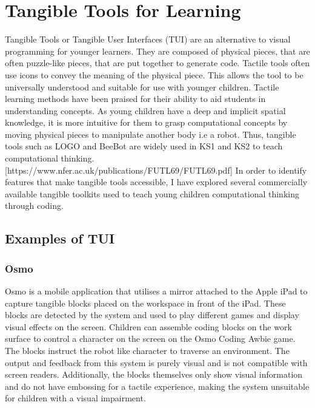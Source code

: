 \documentclass[oneside,%
                    author={Malak Hajji},
                    degree={BSc},
                    title={Designing An Accessible Computational Toolkit For Students},
                  subtitle={With Mixed Visual Abilities}]{dissertation}
\begin{document}
\section{Tangible Tools for Learning}

Tangible Tools or Tangible User Interfaces (TUI) are an alternative to visual programming for younger learners. They are composed of physical pieces, that are often puzzle-like pieces, that are put together to generate code. Tactile tools often use icons to convey the meaning of the physical piece. This allows the tool to be universally understood and suitable for use with younger children. Tactile learning methods have been praised for their ability to aid students in understanding concepts. As young children have a deep and implicit spatial knowledge, it is more intuitive for them to grasp computational concepts by moving physical pieces to manipulate another body i.e a robot. Thus, tangible tools such as LOGO and BeeBot are widely used in KS1 and KS2 to teach computational thinking. [https://www.nfer.ac.uk/publications/FUTL69/FUTL69.pdf]
In order to identify features that make tangible tools accessible, I have explored several commercially available tangible toolkits used to teach young children computational thinking through coding.

\subsection{Examples of TUI}
\subsubsection{Osmo}
Osmo is a mobile application that utilises a mirror attached to the Apple iPad to capture tangible blocks placed on the workspace in front of the iPad. These blocks are detected by the system and used to play different games and display visual effects on the screen. Children can assemble coding blocks on the work surface to control a character on the screen on the Osmo Coding Awbie game. The blocks instruct the robot like character to traverse an environment. The output and feedback from this system is purely visual and is not compatible with screen readers. Additionally, the blocks themselves only show visual information and do not have embossing for a tactile experience, making the system unsuitable for children with a visual impairment.  
\end{document}
